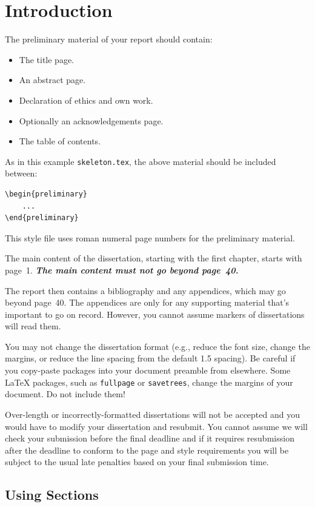 \documentclass[logo,msc]{infthesis}           %
\begin{document}
\chapter{Introduction}

The preliminary material of your report should contain:
\begin{itemize}
\item
The title page.
\item
An abstract page.
\item
Declaration of ethics and own work.
\item
Optionally an acknowledgements page.
\item
The table of contents.
\end{itemize}

As in this example \texttt{skeleton.tex}, the above material should be
included between:
\begin{verbatim}
\begin{preliminary}
    ...
\end{preliminary}
\end{verbatim}
This style file uses roman numeral page numbers for the preliminary material.

The main content of the dissertation, starting with the first chapter,
starts with page~1. \emph{\textbf{The main content must not go beyond page~40.}}

The report then contains a bibliography and any appendices, which may go beyond
page~40. The appendices are only for any supporting material that's important to
go on record. However, you cannot assume markers of dissertations will read them.

You may not change the dissertation format (e.g., reduce the font size, change
the margins, or reduce the line spacing from the default 1.5 spacing). Be
careful if you copy-paste packages into your document preamble from elsewhere.
Some \LaTeX{} packages, such as \texttt{fullpage} or \texttt{savetrees}, change
the margins of your document. Do not include them!

Over-length or incorrectly-formatted dissertations will not be accepted and you
would have to modify your dissertation and resubmit. You cannot assume we will
check your submission before the final deadline and if it requires resubmission
after the deadline to conform to the page and style requirements you will be
subject to the usual late penalties based on your final submission time.

\section{Using Sections}
\end{document}
